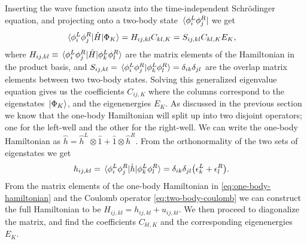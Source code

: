 \documentclass[twocolumn,superscriptaddress,unsortedaddress,
 amsmath,amssymb,
 aps,
]{revtex4-2}
\begin{document}
        Inserting the wave function ansatz into the time-independent Schrödinger
        equation, and projecting onto a two-body state
        $\bra*{\phi^L_i \phi^R_j}$ we get
        \begin{align*}
            \mel*{\phi^L_i \phi^R_j}{\hat{H}}{\Phi_K}
            &= %
            H_{ij, kl} C_{kl, K}
            = S_{ij, kl} C_{kl, K} E_{K},
        \end{align*}
        where $H_{ij, kl} \equiv \mel*{\phi^L_i \phi^R_j}{\hat{H}}{
        \phi^L_k \phi^R_l}$ are the matrix elements of the Hamiltonian in
        the product basis, and $S_{ij, kl} = \braket*{
        \phi^L_i \phi^R_j}{\phi^L_k \phi^R_l} = \delta_{ik} \delta_{jl}$ are
        the overlap matrix elements between two two-body states.
        Solving this generalized eigenvalue equation gives us the
        coefficients $C_{ij, K}$ where the columns correspond to the
        eigenstates $\ket*{\Phi_K}$, and the eigenenergies $E_K$.
        As discussed in the previous section we know that the one-body Hamiltonian
        will split up into two disjoint operators; one for the left-well and the
        other for the right-well.
        We can write the one-body Hamiltonian as $\hat{h} = \hat{h}^L \otimes \hat{1}
        + \hat{1} \otimes \hat{h}^{R}$.
        From the orthonormality of the two sets of eigenstates we get
        \begin{align}
            h_{ij, kl}
            &= \mel*{\phi^L_i \phi^R_j}{\hat{h}}{\phi^L_k \phi^R_l}
            = \delta_{ik} \delta_{jl} \qty(
                \epsilon^L_k
                + \epsilon^{R}_l
            ).
            \label{eq:one-body-hamiltonian}
        \end{align}
        From the matrix elements of the one-body Hamiltonian in
        \eqref{eq:one-body-hamiltonian} and the Coulomb operator
        \eqref{eq:two-body-coulomb} we can construct the full Hamiltonian
        to be $H_{ij, kl} = h_{ij, kl} + u_{ij, kl}$.
        We then proceed to diagonalize the matrix, and find the coefficients
        $C_{kl, K}$ and the corresponding eigenenergies $E_K$.
\end{document}

